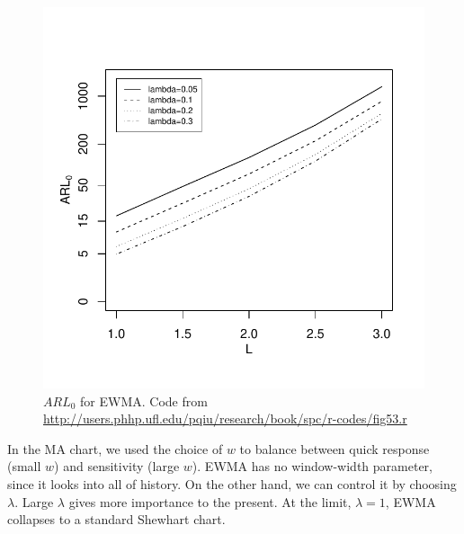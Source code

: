 \begin{figure}[h]
\centering
\includegraphics[height=0.3\textheight]{art/fig53}
\caption[$ARL_0$ for EWMA]{$ARL_0$ for EWMA. \newline Code from \url{http://users.phhp.ufl.edu/pqiu/research/book/spc/r-codes/fig53.r}}
\label{fig:arl_0_ewma}
\end{figure}

In the MA chart, we used the choice of $w$ to balance between quick response (small $w$) and sensitivity (large $w$).
EWMA has no window-width parameter, since it looks into all of history. On the other hand, we can control it by choosing $\lambda$. 
Large $\lambda$ gives more importance to the present. At the limit, $\lambda=1$, EWMA collapses to a standard Shewhart chart.



